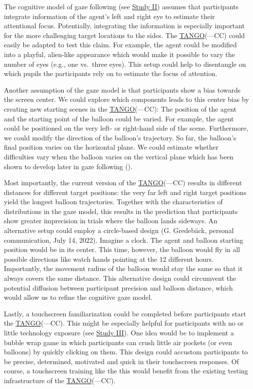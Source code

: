 \documentclass[
]{scrbook}
\begin{document}
The cognitive model of gaze following (see \hyperref[studyII]{Study II}) assumes that participants integrate information of the agent's left and right eye to estimate their attentional focus. Potentially, integrating the information is especially important for the more challenging target locations to the sides. The \hyperref[acronyms_TANGO]{TANGO}(---CC) could easily be adapted to test this claim. For example, the agent could be modified into a playful, alien-like appearance which would make it possible to vary the number of eyes (e.g., one vs.~three eyes). This setup could help to disentangle on which pupils the participants rely on to estimate the focus of attention.

Another assumption of the gaze model is that participants show a bias towards the screen center. We could explore which components leads to this center bias by creating new starting scenes in the \hyperref[acronyms_TANGO]{TANGO}(---CC): The position of the agent and the starting point of the balloon could be varied. For example, the agent could be positioned on the very left- or right-hand side of the scene. Furthermore, we could modify the direction of the balloon's trajectory. So far, the balloon's final position varies on the horizontal plane. We could estimate whether difficulties vary when the balloon varies on the vertical plane which has been shown to develop later in gaze following ().

Most importantly, the current version of the \hyperref[acronyms_TANGO]{TANGO}(---CC) results in different distances for different target positions: the very far left and right target positions yield the longest balloon trajectories. Together with the characteristics of distributions in the gaze model, this results in the prediction that participants show greater imprecision in trials where the balloon lands sideways. An alternative setup could employ a circle-based design (G. Gredebäck, personal communication, July 14, 2022). Imagine a clock. The agent and balloon starting position would be in its center. This time, however, the balloon would fly in all possible directions like watch hands pointing at the 12 different hours. Importantly, the movement radius of the balloon would stay the same so that it always covers the same distance. This alternative design could circumvent the potential diffusion between participant precision and balloon distance, which would allow us to refine the cognitive gaze model.

Lastly, a touchscreen familiarization could be completed before participants start the \hyperref[acronyms_TANGO]{TANGO}(---CC). This might be especially helpful for participants with no or little technology exposure (see \hyperref[studyIII]{Study III}). One idea would be to implement a bubble wrap game in which participants can crush little air pockets (or even balloons) by quickly clicking on them. This design could accustom participants to be precise, determined, motivated and quick in their touchscreen responses. Of course, a touchscreen training like the this would benefit from the existing testing infrastructure of the \hyperref[acronyms_TANGO]{TANGO}(---CC).
\end{document}
